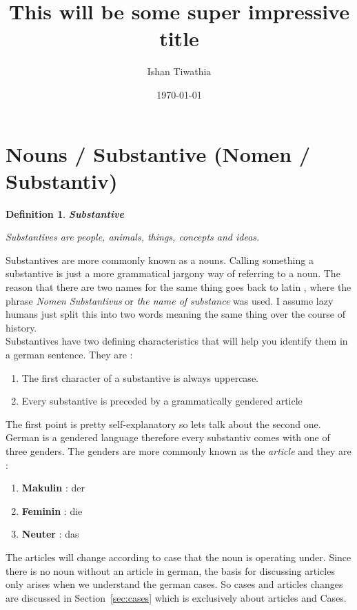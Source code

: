 \documentclass[a4paper,12pt]{article}
\title{This will be some super impressive title}
\author{Ishan Tiwathia}
\date{\today}
\newtheorem{mydef}{Definition}
\begin{document}
\justify
\tableofcontents
\listoftables
\pagebreak

\section{Nouns / Substantive (Nomen / Substantiv)}
\label{sec:substantive}

\begin{mydef}{\bf{Substantive}}
\begin{defn-background}

Substantives are people, animals, things, concepts and ideas.

\end{defn-background}
\end{mydef}
\vspace{0.25cm}

Substantives are more commonly known as a nouns. Calling something a substantive
is just a more grammatical jargony way of referring to a noun. The reason that
there are two names for the same thing goes back to latin , where the phrase
\textit{Nomen Substantivus} or \textit{the name of substance} was used. I assume
lazy humans just split this into two words meaning the same thing over the
course of history.\\

Substantives have two defining characteristics that will help you identify them
in a german sentence. They are :

\begin{enumerate}[noitemsep]
	\item The first character of a substantive is always uppercase.
	\item Every substantive is preceded by a grammatically gendered article
\end{enumerate}

The first point is pretty self-explanatory so lets talk about the second one.
German is a gendered language therefore every substantiv comes with one of three
genders. The genders are more commonly known as the \textit{article} and they
are :

\begin{enumerate}[noitemsep]
	\item \textbf{Makulin }: der
	\item \textbf{Feminin} : die
	\item \textbf{Neuter}  : das
\end{enumerate}


The articles will change according to case that the noun is operating under.
Since there is no noun without an article in german, the basis for discussing
articles only arises when we understand the german cases. So cases and articles
changes are discussed in Section~\ref{sec:cases} which is exclusively about
articles and Cases. \\
\end{document}
